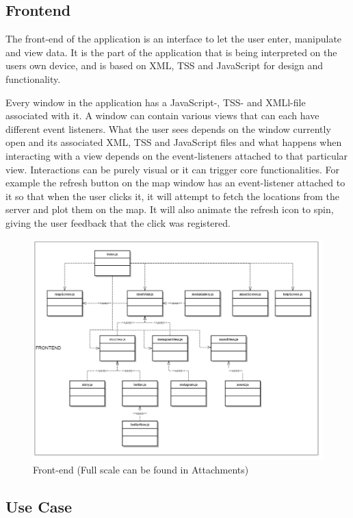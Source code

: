 \subsection{Frontend}
The front-end of the application is an interface to let the user enter, manipulate and view data. It is the part of the application that is being interpreted on the users own device, and is based on XML, TSS and JavaScript for design and functionality. 

Every window in the application has a JavaScript-, TSS- and XMLl-file associated with it. A window can contain various views that can each have different event listeners. What the user sees depends on the window currently open and its associated XML, TSS and JavaScript files and what happens when interacting with a view depends on the event-listeners attached to that particular view. Interactions can be purely visual or it can trigger core functionalities. For example the refresh button on the map window has an event-listener attached to it so that when the user clicks it, it will attempt to fetch the locations from the server and plot them on the map. It will also animate the refresh icon to spin, giving the user feedback that the click was registered.

\begin{figure}[!h]
\begin{center}
\includegraphics[scale=0.1]{class-frontend.png}
\caption{Front-end (Full scale can be found in Attachments)}
\end{center}
\end{figure}

\subsection{Use Case}

